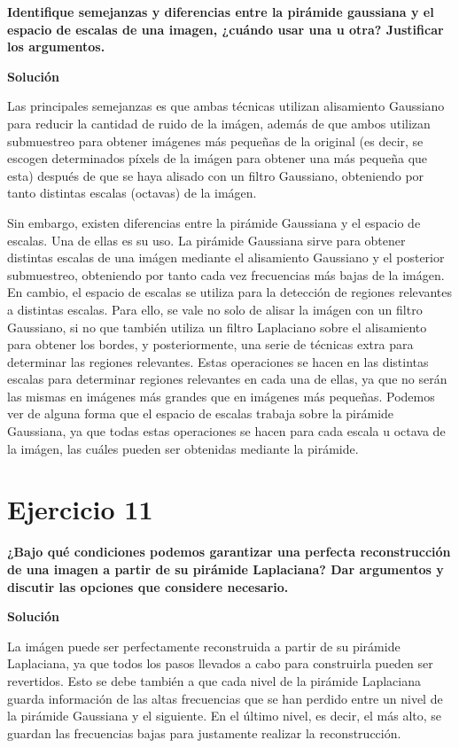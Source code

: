 \documentclass[11pt,a4paper]{article}
\newcommand{\answer}{\noindent\textbf{Solución}}
\newcommand{\question}[1]{\noindent\textbf{#1}}
\newcommand{\nonumbersection}[1]{\section*{#1}\addcontentsline{toc}{section}{#1}}
\begin{document}
\question{Identifique semejanzas y diferencias entre la pirámide gaussiana y
el espacio de escalas de una imagen, ¿cuándo usar una u otra? Justificar
los argumentos.}

\answer

Las principales semejanzas es que ambas técnicas utilizan alisamiento Gaussiano para reducir la cantidad
de ruido de la imágen, además de que ambos utilizan submuestreo para obtener imágenes más
pequeñas de la original (es decir, se escogen determinados píxels de la imágen para obtener una
más pequeña que esta) después de que se haya alisado con un filtro Gaussiano, obteniendo
por tanto distintas escalas (octavas) de la imágen.

Sin embargo, existen diferencias entre la pirámide Gaussiana y el espacio de escalas. Una de ellas es su uso.
La pirámide Gaussiana sirve para obtener distintas escalas de una imágen mediante
el alisamiento Gaussiano y el posterior submuestreo, obteniendo por tanto cada vez frecuencias más bajas de la imágen.
En cambio, el espacio de escalas se utiliza para la detección de regiones relevantes a distintas escalas. Para ello,
se vale no solo de alisar la imágen con un filtro Gaussiano, si no que también utiliza un filtro Laplaciano sobre el alisamiento
para obtener los bordes, y posteriormente, una serie de técnicas extra para determinar las regiones relevantes. Estas
operaciones se hacen en las distintas escalas para determinar regiones relevantes en cada una de ellas, ya que no serán las mismas
en imágenes más grandes que en imágenes más pequeñas. Podemos ver de alguna forma que el espacio de escalas trabaja sobre
la pirámide Gaussiana, ya que todas estas operaciones se hacen para cada escala u octava de la imágen, las cuáles pueden
ser obtenidas mediante la pirámide.


\nonumbersection{Ejercicio 11}

\question{¿Bajo qué condiciones podemos garantizar una perfecta reconstrucción
de una imagen a partir de su pirámide Laplaciana? Dar argumentos y
discutir las opciones que considere necesario.}

\answer

La imágen puede ser perfectamente reconstruida a partir de su pirámide Laplaciana, ya que todos
los pasos llevados a cabo para construirla pueden ser revertidos. Esto se debe también a que cada nivel de la pirámide
Laplaciana guarda información de las altas frecuencias que se han perdido entre un nivel de la pirámide Gaussiana y el siguiente.
En el último nivel, es decir, el más alto, se guardan las frecuencias bajas para justamente realizar la reconstrucción.
\end{document}
